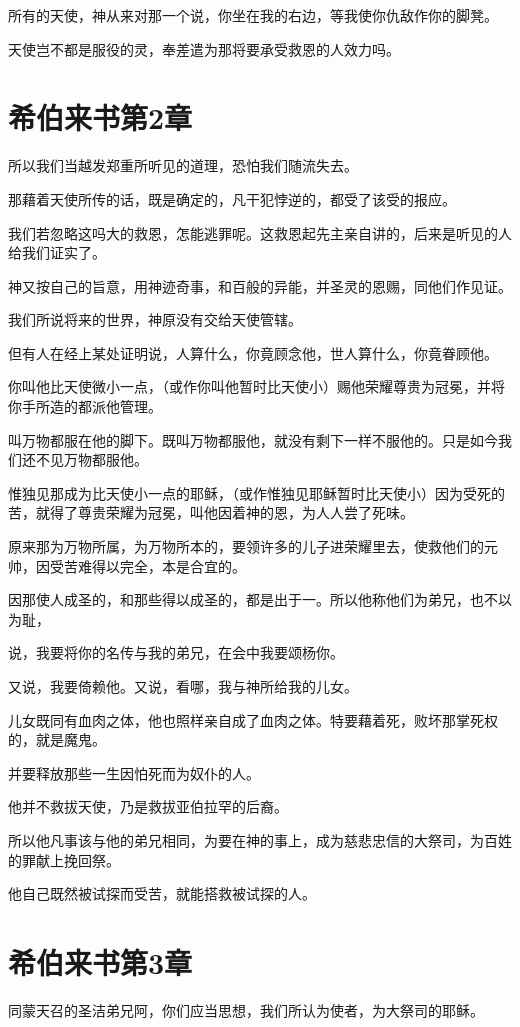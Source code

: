 \documentclass[12pt,oneside]{book}
\begin{document}
所有的天使，神从来对那一个说，你坐在我的右边，等我使你仇敌作你的脚凳。

天使岂不都是服役的灵，奉差遣为那将要承受救恩的人效力吗。

\chapter{希伯来书第2章}
所以我们当越发郑重所听见的道理，恐怕我们随流失去。

那藉着天使所传的话，既是确定的，凡干犯悖逆的，都受了该受的报应。

我们若忽略这吗大的救恩，怎能逃罪呢。这救恩起先主亲自讲的，后来是听见的人给我们证实了。

神又按自己的旨意，用神迹奇事，和百般的异能，并圣灵的恩赐，同他们作见证。

我们所说将来的世界，神原没有交给天使管辖。

但有人在经上某处证明说，人算什么，你竟顾念他，世人算什么，你竟眷顾他。

你叫他比天使微小一点，（或作你叫他暂时比天使小）赐他荣耀尊贵为冠冕，并将你手所造的都派他管理。

叫万物都服在他的脚下。既叫万物都服他，就没有剩下一样不服他的。只是如今我们还不见万物都服他。

惟独见那成为比天使小一点的耶稣，（或作惟独见耶稣暂时比天使小）因为受死的苦，就得了尊贵荣耀为冠冕，叫他因着神的恩，为人人尝了死味。

原来那为万物所属，为万物所本的，要领许多的儿子进荣耀里去，使救他们的元帅，因受苦难得以完全，本是合宜的。

因那使人成圣的，和那些得以成圣的，都是出于一。所以他称他们为弟兄，也不以为耻，

说，我要将你的名传与我的弟兄，在会中我要颂杨你。

又说，我要倚赖他。又说，看哪，我与神所给我的儿女。

儿女既同有血肉之体，他也照样亲自成了血肉之体。特要藉着死，败坏那掌死权的，就是魔鬼。

并要释放那些一生因怕死而为奴仆的人。

他并不救拔天使，乃是救拔亚伯拉罕的后裔。

所以他凡事该与他的弟兄相同，为要在神的事上，成为慈悲忠信的大祭司，为百姓的罪献上挽回祭。

他自己既然被试探而受苦，就能搭救被试探的人。

\chapter{希伯来书第3章}
同蒙天召的圣洁弟兄阿，你们应当思想，我们所认为使者，为大祭司的耶稣。
\end{document}

